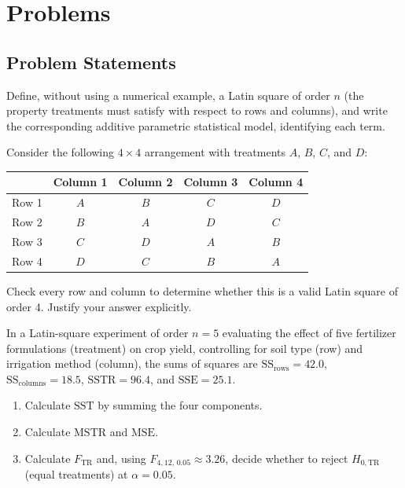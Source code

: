 \section*{Problems}

\subsection*{Problem Statements}

\begin{problema}
\label{prob:e90018f}
Define, without using a numerical example, a Latin square of order $n$ (the property treatments must satisfy with respect to rows and columns), and write the corresponding additive parametric statistical model, identifying each term.
\end{problema}

\begin{problema}
\label{prob:8e9e6f8}
Consider the following $4\times4$ arrangement with treatments $A$, $B$, $C$, and $D$:
\begin{center}
\begin{tabular}{c|cccc}
 & Column 1 & Column 2 & Column 3 & Column 4 \\ \hline
Row 1 & $A$ & $B$ & $C$ & $D$ \\
Row 2 & $B$ & $A$ & $D$ & $C$ \\
Row 3 & $C$ & $D$ & $A$ & $B$ \\
Row 4 & $D$ & $C$ & $B$ & $A$ \\
\end{tabular}
\end{center}
Check every row and column to determine whether this is a valid Latin square of order 4. Justify your answer explicitly.
\end{problema}

\begin{problema}
\label{prob:f64d8dc}
In a Latin-square experiment of order $n=5$ evaluating the effect of five fertilizer formulations (treatment) on crop yield, controlling for soil type (row) and irrigation method (column), the sums of squares are $\text{SS}_{\text{rows}}=42.0$, $\text{SS}_{\text{columns}}=18.5$, $\text{SSTR}=96.4$, and $\text{SSE}=25.1$.
\begin{enumerate}
\item Calculate $\text{SST}$ by summing the four components.
\item Calculate $\text{MSTR}$ and $\text{MSE}$.
\item Calculate $F_{\text{TR}}$ and, using $F_{4,12,\,0.05}\approx3.26$, decide whether to reject $H_{0,\text{TR}}$ (equal treatments) at $\alpha=0.05$.
\end{enumerate}
\end{problema}

